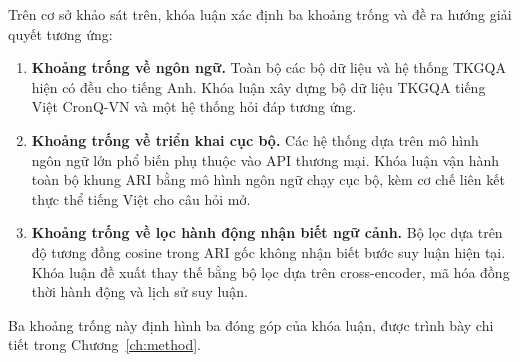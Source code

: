 
\medskip

Trên cơ sở khảo sát trên, khóa luận xác định ba khoảng trống và đề ra hướng giải quyết tương ứng:

\begin{enumerate}
  \item \textbf{Khoảng trống về ngôn ngữ.} Toàn bộ các bộ dữ liệu và hệ thống TKGQA hiện có đều cho
  tiếng Anh. Khóa luận xây dựng bộ dữ liệu TKGQA tiếng Việt CronQ-VN và một hệ thống hỏi đáp tương
  ứng.
  \item \textbf{Khoảng trống về triển khai cục bộ.} Các hệ thống dựa trên mô hình ngôn ngữ lớn phổ
  biến phụ thuộc vào API thương mại. Khóa luận vận hành toàn bộ khung ARI bằng mô hình ngôn ngữ
  chạy cục bộ, kèm cơ chế liên kết thực thể tiếng Việt cho câu hỏi mở.
  \item \textbf{Khoảng trống về lọc hành động nhận biết ngữ cảnh.} Bộ lọc dựa trên độ tương đồng
  cosine trong ARI gốc không nhận biết bước suy luận hiện tại. Khóa luận đề xuất thay thế bằng bộ
  lọc dựa trên cross-encoder, mã hóa đồng thời hành động và lịch sử suy luận.
\end{enumerate}

Ba khoảng trống này định hình ba đóng góp của khóa luận, được trình bày chi tiết trong
Chương~\ref{ch:method}.
